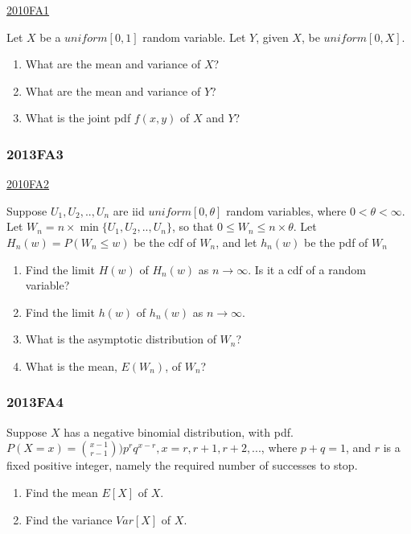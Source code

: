\documentclass[10pt,twocolumn,portrait]{article}
\begin{document}
\protect\hyperlink{fa1-1}{2010FA1}

Let \(X\) be a \(uniform[0,1]\) random variable. Let \(Y\), given \(X\),
be \(uniform[0,X]\).

\begin{enumerate}
\def\labelenumi{(\alph{enumi})}
\item
  What are the mean and variance of \(X\)?
\item
  What are the mean and variance of \(Y\)?
\item
  What is the joint pdf \(f(x,y)\) of \(X\) and \(Y\)?
\end{enumerate}

\hypertarget{fa3-2}{%
\subsubsection{2013FA3}\label{fa3-2}}

\protect\hyperlink{fa2-1}{2010FA2}

Suppose \(U_1,U_2,..,U_n\) are iid \(uniform[0,\theta]\) random
variables, where \(0<\theta<\infty\). Let
\(W_n=n\times\min\{U_1,U_2,..,U_n\}\), so that
\(0\le W_n\le n\times\theta\). Let \(H_n(w)=P(W_n\le w)\) be the cdf of
\(W_n\), and let \(h_n(w)\) be the pdf of \(W_n\)

\begin{enumerate}
\def\labelenumi{(\alph{enumi})}
\item
  Find the limit \(H(w)\) of \(H_n(w)\) as \(n\to\infty\). Is it a cdf
  of a random variable?
\item
  Find the limit \(h(w)\) of \(h_n(w)\) as \(n\to\infty\).
\item
  What is the asymptotic distribution of \(W_n\)?
\item
  What is the mean, \(E(W_n)\), of \(W_n\)?
\end{enumerate}

\hypertarget{fa4-2}{%
\subsubsection{2013FA4}\label{fa4-2}}

Suppose \(X\) has a negative binomial distribution, with pdf.
\(P(X=x)=\binom{x-1}{r-1})p^rq^{x-r},x=r,r+1,r+2,...\), where
\(p+ q=1\), and \(r\) is a fixed positive integer, namely the required
number of successes to stop.

\begin{enumerate}
\def\labelenumi{(\alph{enumi})}
\item
  Find the mean \(E[X]\) of \(X\).
\item
  Find the variance \(Var[X]\) of \(X\).
\end{enumerate}
\end{document}
